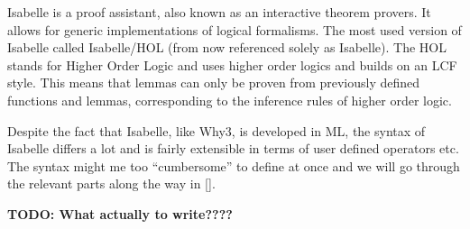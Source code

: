 
Isabelle is a proof assistant, also known as an interactive theorem provers.
It allows for generic implementations of logical formalisms.
The most used version of Isabelle called Isabelle/HOL (from now referenced solely as Isabelle).
The HOL stands for Higher Order Logic and uses higher order logics and builds on an LCF style.
This means that lemmas can only be proven from previously defined functions and lemmas, corresponding to the inference rules of higher order logic.

Despite the fact that Isabelle, like Why3, is developed in ML, the syntax of Isabelle differs a lot and is fairly extensible in terms of user defined operators etc.
The syntax might me too ``cumbersome'' to define at once and we will go through the relevant parts along the way in \ref{}.

\textbf{TODO: What actually to write????}
